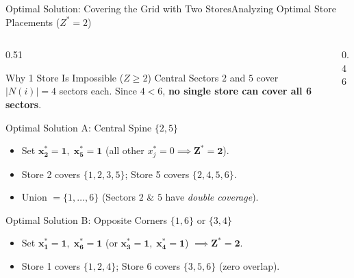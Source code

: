 \documentclass[aspectratio=169]{beamer}
\begin{document}
\begin{frame}{Optimal Solution: Covering the Grid with Two Stores}{Analyzing Optimal Store Placements ($Z^* = 2$)}
\begin{columns}[T,onlytextwidth]
\begin{column}{0.51\textwidth}
  \scriptsize
  \vspace{-4pt}
  \begin{alertblock}{Why 1 Store Is Impossible ($Z \ge 2$)}
    Central Sectors $2$ and $5$ cover $|N(i)| = 4$ sectors each. Since $4 < 6$, \textbf{no single store can cover all 6 sectors}.
  \end{alertblock}
  \vspace{-5pt}
  \begin{exampleblock}{Optimal Solution A: Central Spine $\{2, 5\}$}
    \begin{itemize}\setlength{\itemsep}{0pt}
      \item Set $\mathbf{x_2^* = 1, \; x_5^* = 1}$ (all other $x_j^* = 0 \implies \mathbf{Z^* = 2}$).
      \item Store 2 covers $\{1, 2, 3, 5\}$; Store 5 covers $\{2, 4, 5, 6\}$.
      \item Union $= \{1,\dots,6\}$ (Sectors $2$ \& $5$ have \emph{double coverage}).
    \end{itemize}
  \end{exampleblock}
  \vspace{-5pt}
  \begin{block}{Optimal Solution B: Opposite Corners $\{1, 6\}$ or $\{3, 4\}$}
    \begin{itemize}\setlength{\itemsep}{0pt}
      \item Set $\mathbf{x_1^* = 1, \; x_6^* = 1}$ (or $\mathbf{x_3^* = 1, \; x_4^* = 1}$) $\implies \mathbf{Z^* = 2}$.
      \item Store 1 covers $\{1, 2, 4\}$; Store 6 covers $\{3, 5, 6\}$ (zero overlap).
    \end{itemize}
  \end{block}
\end{column}
\begin{column}{0.46\textwidth}
  \centering
  \vspace{-2pt}
  \begin{tikzpicture}[every node/.style={font=\scriptsize}]

\end{tikzpicture}
\end{column}
\end{columns}
\end{frame}
\end{document}
